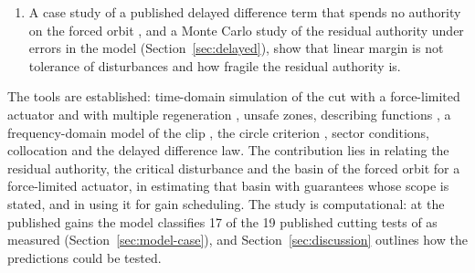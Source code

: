 \begin{enumerate}
\item A case study of a published delayed difference term that spends no authority on the forced orbit \citep{pyragas1992continuous,li2022ijamt}, and a Monte Carlo study of the residual authority under errors in the model (Section~\ref{sec:delayed}), show that linear margin is not tolerance of disturbances and how fragile the residual authority is.
\end{enumerate}
The tools are established: time-domain simulation of the cut with a force-limited actuator \citep{mancisidor2015coupled,ozsoy2026robust} and with multiple regeneration \citep{tlusty1981basic}, unsafe zones, describing functions \citep{gelb1968describing}, a frequency-domain model of the clip \citep{ozsoy2025frequency}, the circle criterion \citep{zames1966inputII}, sector conditions, collocation and the delayed difference law. The contribution lies in relating the residual authority, the critical disturbance and the basin of the forced orbit for a force-limited actuator, in estimating that basin with guarantees whose scope is stated, and in using it for gain scheduling. The study is computational: at the published gains the model classifies 17 of the 19 published cutting tests of \citet{ozsoy2026robust} as measured (Section~\ref{sec:model-case}), and Section~\ref{sec:discussion} outlines how the predictions could be tested.
